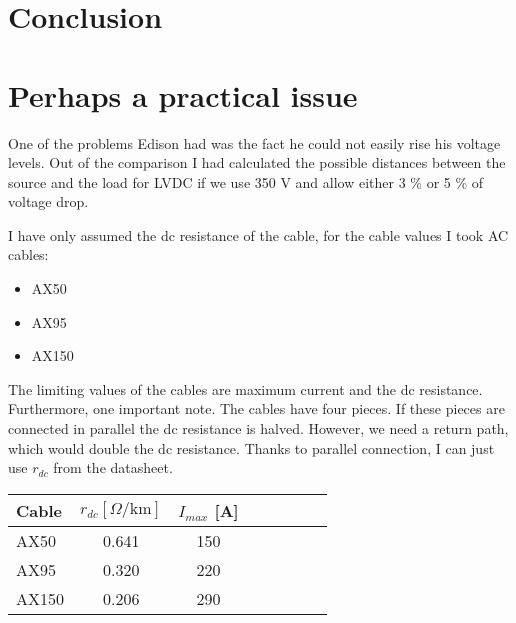 \documentclass[]{scrartcl}
\begin{document}
\section{Conclusion}
\newpage
\newpage
\appendix
\section{Perhaps a practical issue}
One of the problems Edison had was the fact he could not easily rise his voltage levels. Out of the comparison I had calculated the possible distances between the source and the load for LVDC if we use 350 V and allow either 3 \% or 5 \% of voltage drop. 

I have only assumed the dc resistance of the cable, for the cable values I took AC cables:
\begin{itemize}
	\item AX50
	\item AX95
	\item AX150
\end{itemize}

The limiting values of the cables are maximum current and the dc resistance. Furthermore, one important note. The cables have four pieces. If  these pieces are connected in parallel the dc resistance is halved. However, we need a return path, which would double the dc resistance. Thanks to parallel connection, I can just use $r_{dc}$ from the datasheet. 
\begin{center}
	\begin{tabular}{l*{6}{c}r}
		Cable             & $r_{dc} [\Omega/\text{km}]$ & $I_{max}$ [A]  \\
		\hline
		\hline
		AX50  & 0.641 & 150   \\
		AX95  & 0.320 & 220   \\
		AX150 & 0.206 & 290   \\
	\end{tabular}
\end{center}
\end{document}
